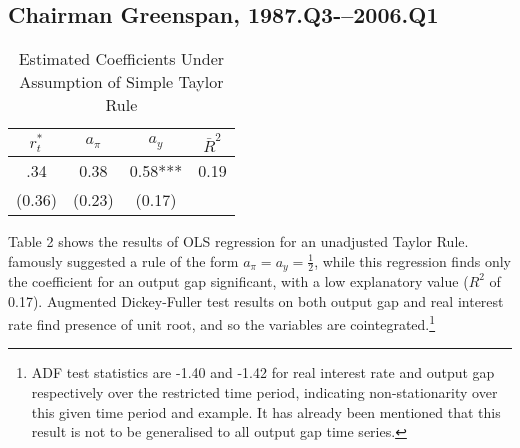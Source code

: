 \documentclass[notitlepage,12pt]{article}
\begin{document}
\subsection{Chairman Greenspan, 1987.Q3-–2006.Q1}
\begin{table}[H]
\centering
\caption{Estimated Coefficients Under Assumption of Simple Taylor Rule}
\begin{tabular}{ccc|c}
$r_{t}^{*}$ & $a_{\pi }$ & $a_{y}$ & ${\bar R}^2$\\
\toprule
.34 & 0.38& 0.58***& 0.19\\
(0.36) & (0.23)& (0.17)  \\
\midrule
\bottomrule
\end{tabular}
\end{table}
Table 2 shows the results of OLS regression for an unadjusted Taylor Rule.  \cite{taylor1993discretion} famously suggested a rule of the form $a_{\pi }=a_{y}=\frac{1}{2}$, while this regression finds only the coefficient for an output gap significant, with a low explanatory value ($R^2$ of 0.17).  Augmented Dickey-Fuller test results on both output gap and real interest rate find presence of unit root, and so the variables are cointegrated.\footnote{ADF test statistics are -1.40 and -1.42 for real interest rate and output gap respectively over the restricted time period, indicating non-stationarity over this given time period and example.  It has already been mentioned that this result is not to be generalised to all output gap time series.} 
\end{document}
